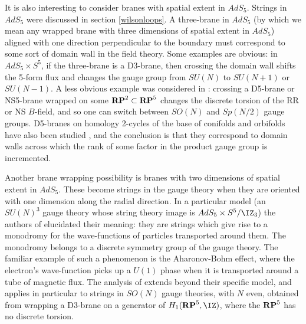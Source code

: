 It is also interesting to consider branes with spatial extent in $AdS_5$.
Strings in $AdS_5$ were discussed in section \ref{wilsonloops}.  A
three-brane in $AdS_5$ (by which we mean any wrapped brane with three
dimensions of spatial extent in $AdS_5$) aligned with one direction
perpendicular to the boundary must correspond to some sort of domain wall
in the field theory.  Some examples are obvious: in $AdS_5 \times S^5$, if
the three-brane is a D3-brane, then crossing the domain wall shifts the
5-form flux and changes the gauge group from $SU(N)$ to $SU(N+1)$ or
$SU(N-1)$.  A less obvious example was considered in \cite{Witten:1998xy}:
crossing a D5-brane or NS5-brane wrapped on some ${\bf RP}^2 \subset {\bf
RP}^5$ changes the discrete torsion of the RR or NS $B$-field, and so one
can switch between $SO(N)$ and $Sp(N/2)$ gauge groups.  D5-branes on
homology 2-cycles of the base of conifolds and orbifolds have also been
studied \cite{Gubser:1998fp,Gubser:1999ia,Gukov:1998kn,Dasgupta:1999wx},
and the conclusion is that they correspond to domain walls across which the
rank of some factor in the product gauge group is incremented.

Another brane wrapping possibility is branes with two dimensions of spatial
extent in $AdS_5$.  These become strings in the gauge theory when they are
oriented with one dimension along the radial direction.  In a particular
model (an $SU(N)^3$ gauge theory whose string theory image is $AdS_5 \times
S^5/\IZ_3$) the authors of \cite{Gukov:1998kn} elucidated their
meaning: they are strings which give rise to a monodromy for the
wave-functions of particles transported around them.  The monodromy belongs
to a discrete symmetry group of the gauge theory.  The familiar example of
such a phenomenon is the Aharonov-Bohm effect, where the electron's
wave-function picks up a $U(1)$ phase when it is transported around a tube
of magnetic flux.  The analysis of \cite{Gukov:1998kn} extends beyond their
specific model, and applies in particular to strings in $SO(N)$ gauge
theories, with $N$ even, obtained from wrapping a D3-brane on a generator
of $H_1({\bf RP}^5,\IZ)$, where the ${\bf RP}^5$ has no discrete
torsion.

